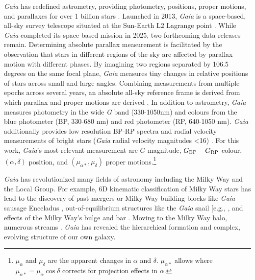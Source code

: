 \emph{Gaia} has redefined astrometry, providing photometry, positions,
proper motions, and parallaxes for over 1 billion stars
\citep{gaialcollaboration+2021}. Launched in 2013, \emph{Gaia} is a
space-based, all-sky survey telescope situated at the Sun-Earth L2
Lagrange point \citep{gaiacollaboration+2016}. While \emph{Gaia}
completed its space-based mission in 2025, two forthcoming data releases
remain. Determining absolute parallax measurement is facilitated by the
observation that stars in different regions of the sky are affected by
parallax motion with different phases. By imagining two regions
separated by 106.5 degrees on the same focal plane, \emph{Gaia} measures
tiny changes in relative positions of stars across small and large
angles. Combining measurements from multiple epochs across several
years, an absolute all-sky reference frame is derived from which
parallax and proper motions are derived \citep{gaiacollaboration+2016}.
In addition to astrometry, \emph{Gaia} measures photometry in the wide
\emph{G} band (330-1050nm) and colours from the blue photometer (BP,
330-680 nm) and red photometer (RP, 640-1050 nm). \emph{Gaia}
additionally provides low resolution BP-RP spectra and radial velocity
measurements of bright stars (\emph{Gaia} radial velocity magnitudes
\textless16) \citep{gaiacollaboration+2016}. For this work,
\emph{Gaia}'s most relevant measurement are \(G\) magnitude,
\(G_{\rm BP} - G_{\rm RP}\) colour, \((\alpha, \delta)\) position, and
\((\mu_{\alpha*}, \mu_\delta)\) proper motions.\footnote{\(\mu_\alpha\)
  and \(\mu_\delta\) are the apparent changes in \(\alpha\) and
  \(\delta\). \(\mu_{\alpha*}\) allows where
  \(\mu_{\alpha*} = \mu_\alpha \cos \delta\) corrects for projection
  effects in \(\alpha\).}

\emph{Gaia} has revolutionized many fields of astronomy including the
Milky Way and the Local Group. For example, 6D kinematic classification
of Milky Way stars has lead to the discovery of past mergers or Milky
Way building blocks like \emph{Gaia}-sausage Enceladus
\citep[e.g.,][]{helmi+2018}, out-of-equilibrium structures like the
\emph{Gaia} snail {[}e.g., \citet{antoja+2018l}, and effects of the
Milky Way's bulge and bar \citep{hunt+vasiliev2025}. Moving to the Milky
Way halo, numerous streams \citep{bonaca+price-whelan2025}. \emph{Gaia}
has revealed the hierarchical formation and complex, evolving structure
of our own galaxy.

